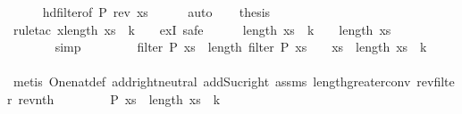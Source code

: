 \begin{isabellebody}
\ \ \ \ \isamarkupfalse%
\ hd{\isacharunderscore}filter{\isacharbrackleft}of\ P\ {\isachardoublequoteopen}rev\ xs{\isachardoublequoteclose}{\isacharbrackright}\isanewline
\ \ \ \ \isamarkupfalse%
\ auto\isanewline
\ \ \isamarkupfalse%
\ {\isacharquery}thesis\isanewline
\ \ \isamarkupfalse%
\ {\isacharparenleft}rule{\isacharunderscore}tac\ x{\isacharequal}{\isachardoublequoteopen}length\ xs\ {\isacharminus}\ {\isacharparenleft}k\ {\isacharplus}\ {}{\isacharparenright}{\isachardoublequoteclose}\ \ exI{\isacharcomma}\ safe{\isacharparenright}\isanewline
\ \ \ \ \isamarkupfalse%
\ {\isachardoublequoteopen}length\ xs\ {\isacharminus}\ {\isacharparenleft}k\ {\isacharplus}\ {}{\isacharparenright}\ {\isacharless}\ length\ xs{\isachardoublequoteclose}\isanewline
\ \ \ \ \ \ \isamarkupfalse%
\ {\isacharasterisk}{\isacharparenleft}{}{\isacharparenright}\isanewline
\ \ \ \ \ \ \isamarkupfalse%
\ simp\isanewline
\ \ \isamarkupfalse%
\isanewline
\ \ \ \ \isamarkupfalse%
\ {\isachardoublequoteopen}filter\ P\ xs\ {\isacharbang}\ {\isacharparenleft}length\ {\isacharparenleft}filter\ P\ xs{\isacharparenright}\ {\isacharminus}\ {}{\isacharparenright}\ {\isacharequal}\ xs\ {\isacharbang}\ {\isacharparenleft}length\ xs\ {\isacharminus}\ {\isacharparenleft}k\ {\isacharplus}\ {}{\isacharparenright}{\isacharparenright}{\isachardoublequoteclose}\isanewline
\ \ \ \ \ \ \isamarkupfalse%
\ {\isacharasterisk}{\isacharparenleft}{}{\isacharparenright}\ {\isacharasterisk}{\isacharparenleft}{}{\isacharparenright}\isanewline
\ \ \ \ \ \ \isamarkupfalse%
\ {\isacharparenleft}metis\ One{\isacharunderscore}nat{\isacharunderscore}def\ add{\isachardot}right{\isacharunderscore}neutral\ add{\isacharunderscore}Suc{\isacharunderscore}right\ assms\ length{\isacharunderscore}greater{\isacharunderscore}{}{\isacharunderscore}conv\ rev{\isacharunderscore}filter\ rev{\isacharunderscore}nth{\isacharparenright}\isanewline
\ \ \isamarkupfalse%
\isanewline
\ \ \ \ \isamarkupfalse%
\ {\isachardoublequoteopen}P\ {\isacharparenleft}xs\ {\isacharbang}\ {\isacharparenleft}length\ xs\ {\isacharminus}\ {\isacharparenleft}k\ {\isacharplus}\ {}{\isacharparenright}{\isacharparenright}{\isacharparenright}{\isachardoublequoteclose}\isanewline
\ \ \ \ \ \ \isamarkupfalse%

\end{isabellebody}

